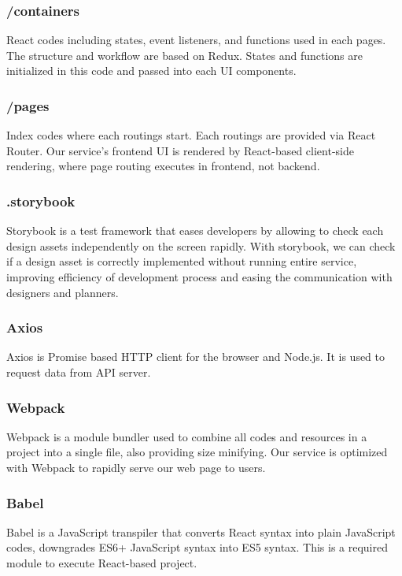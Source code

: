 \documentclass[conference,compsoc]{IEEEtran}
\begin{document}
\subsubsection{/containers}
React codes including states, event listeners, and functions used in each pages. The structure and workflow are based on Redux. States and functions are initialized in this code and passed into each UI components.

\subsubsection{/pages}
Index codes where each routings start. Each routings are provided via React Router. Our service's frontend UI is rendered by React-based client-side rendering, where page routing executes in frontend, not backend.

\subsubsection{.storybook}
Storybook is a test framework that eases developers by allowing to check each design assets independently on the screen rapidly. With storybook, we can check if a design asset is correctly implemented without running entire service, improving efficiency of development process and easing the communication with designers and planners.

\subsubsection{Axios}
Axios is Promise based HTTP client for the browser and Node.js. It is used to request data from API server.

\subsubsection{Webpack}
Webpack is a module bundler used to combine all codes and resources in a project into a single file, also providing size minifying. Our service is optimized with Webpack to rapidly serve our web page to users.

\subsubsection{Babel}
Babel is a JavaScript transpiler that converts React syntax into plain JavaScript codes, downgrades ES6+ JavaScript syntax into ES5 syntax. This is a required module to execute React-based project.
\end{document}
